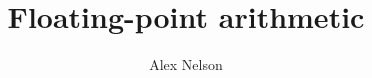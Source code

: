 \documentclass{amsart}
\title{Floating-point arithmetic}
\author{Alex Nelson}
\begin{document}
\maketitle




\nocite{*}


\end{document}
